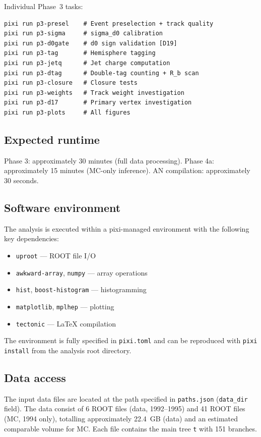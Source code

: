 \documentclass[11pt,a4paper]{article}
\begin{document}
Individual Phase~3 tasks:
\begin{verbatim}
pixi run p3-presel    # Event preselection + track quality
pixi run p3-sigma     # sigma_d0 calibration
pixi run p3-d0gate    # d0 sign validation [D19]
pixi run p3-tag       # Hemisphere tagging
pixi run p3-jetq      # Jet charge computation
pixi run p3-dtag      # Double-tag counting + R_b scan
pixi run p3-closure   # Closure tests
pixi run p3-weights   # Track weight investigation
pixi run p3-d17       # Primary vertex investigation
pixi run p3-plots     # All figures
\end{verbatim}

\subsection{Expected runtime}

Phase 3: approximately 30 minutes (full data processing).
Phase 4a: approximately 15 minutes (MC-only inference).
AN compilation: approximately 30 seconds.

\subsection{Software environment}

The analysis is executed within a pixi-managed environment with the following key
dependencies:
\begin{itemize}
\item \texttt{uproot} --- ROOT file I/O
\item \texttt{awkward-array}, \texttt{numpy} --- array operations
\item \texttt{hist}, \texttt{boost-histogram} --- histogramming
\item \texttt{matplotlib}, \texttt{mplhep} --- plotting
\item \texttt{tectonic} --- LaTeX compilation
\end{itemize}

The environment is fully specified in \texttt{pixi.toml} and can be reproduced
with \texttt{pixi install} from the analysis root directory.

\subsection{Data access}

The input data files are located at the path specified in \texttt{paths.json}
(\texttt{data\_dir} field). The data consist of 6 ROOT files (data, 1992--1995)
and 41 ROOT files (MC, 1994 only), totalling approximately 22.4~GB (data) and
an estimated comparable volume for MC. Each file contains the main tree \texttt{t}
with 151 branches.
\end{document}
